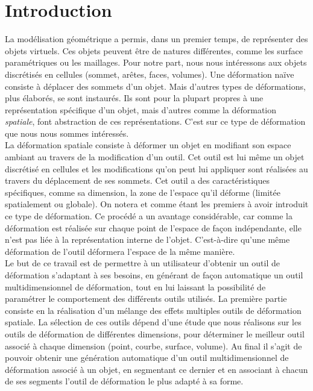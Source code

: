 \chapter{Introduction}

\graphicspath{ {Introduction/IntroductionFigs/PNG/}
  {Introduction/IntroductionFigs/PDF/}
  {Introduction/IntroductionFigs/} }

La modélisation géométrique a permis, dans un premier temps, de
représenter des objets virtuels. Ces objets peuvent être de natures
différentes, comme les surface paramétriques ou les maillages. Pour
notre part, nous nous intéressons aux objets discrétisés en cellules
(sommet, arêtes, faces, volumes). Une déformation naïve consiste à
déplacer des sommets d'un objet. Mais d'autres types de déformations,
plus élaborés, se sont instaurés. Ils sont pour la plupart propres à
une représentation spécifique d'un objet, mais d'autres comme la
déformation \textit{spatiale}, font abstraction de ces
représentations. C'est sur ce type de déformation que nous nous sommes
intéressés.
\\

La déformation spatiale consiste à déformer un objet en modifiant son
espace ambiant au travers de la modification d'un outil. Cet outil est
lui même un objet discrétisé en cellules et les modifications qu'on
peut lui appliquer sont réalisées au travers du déplacement de ses
sommets. Cet outil a des caractéristiques spécifiques, comme sa
dimension, la zone de l'espace qu'il déforme (limitée spatialement ou
globale). On notera \cite{Bar84} et \cite{SP86} comme étant les
premiers à avoir introduit ce type de déformation. Ce procédé a un
avantage considérable, car comme la déformation est réalisée sur
chaque point de l'espace de façon indépendante, elle n'est pas liée à
la représentation interne de l'objet. C'est-à-dire qu'une même
déformation de l'outil déformera l'espace de la même manière.
\\

Le but de ce travail est de permettre à un utilisateur d'obtenir un
outil de déformation s'adaptant à ses besoins, en générant de façon
automatique un outil multidimensionnel de déformation, tout en lui
laissant la possibilité de paramétrer le comportement des différents
outils utilisés. La première partie consiste en la réalisation d'un
mélange des effets multiples outils de déformation spatiale. La
sélection de ces outils dépend d'une étude que nous réalisons sur les
outils de déformation de différentes dimensions, pour déterminer le
meilleur outil associé à chaque dimension (point, courbe, surface,
volume). Au final il s'agit de pouvoir obtenir une génération
automatique d'un outil multidimensionnel de déformation associé à un
objet, en segmentant ce dernier et en associant à chacun de ses
segments l'outil de déformation le plus adapté à sa forme.
\\

